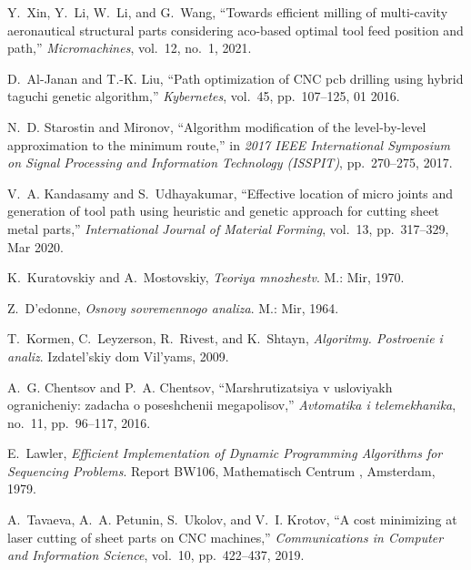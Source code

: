   \item
  Y.~Xin, Y.~Li, W.~Li, and G.~Wang, ``Towards efficient milling of multi-cavity
    aeronautical structural parts considering aco-based optimal tool feed
    position and path,'' {\em Micromachines}, vol.~12, no.~1, 2021.

  \item
  D.~Al-Janan and T.-K. Liu, ``Path optimization of {CNC} pcb drilling using
    hybrid taguchi genetic algorithm,'' {\em Kybernetes}, vol.~45, pp.~107--125,
    01 2016.

  \item
  N.~D. Starostin and Mironov, ``Algorithm modification of the level-by-level
    approximation to the minimum route,'' in {\em 2017 IEEE International
    Symposium on Signal Processing and Information Technology (ISSPIT)},
    pp.~270--275, 2017.

  \item
  V.~A. Kandasamy and S.~Udhayakumar, ``{Effective location of micro joints and
    generation of tool path using heuristic and genetic approach for cutting
    sheet metal parts},'' {\em International Journal of Material Forming},
    vol.~13, pp.~317--329, Mar 2020.

  \item
  K.~Kuratovskiy and A.~Mostovskiy, {\em Teoriya mnozhestv}.
  \newblock M.: Mir, 1970.

  \item
  Z.~D'edonne, {\em Osnovy sovremennogo analiza}.
  \newblock M.: Mir, 1964.

  \item
  T.~Kormen, C.~Leyzerson, R.~Rivest, and K.~Shtayn, {\em Algoritmy. Postroenie i
    analiz}.
  \newblock Izdatel'skiy dom Vil'yams, 2009.

  \item
  A.~G. Chentsov and P.~A. Chentsov, ``Marshrutizatsiya v usloviyakh
    ogranicheniy: zadacha o poseshchenii megapolisov,'' {\em Avtomatika i
    telemekhanika}, no.~11, pp.~96--117, 2016.

  \item
  E.~Lawler, {\em Efficient Implementation of Dynamic Programming Algorithms for
    Sequencing Problems}.
  \newblock Report BW106, Mathematisch Centrum , Amsterdam, 1979.

  \item
  A.~Tavaeva, A.~A. Petunin, S.~Ukolov, and V.~I. Krotov, ``A cost minimizing at
    laser cutting of sheet parts on {{CNC}} machines,'' {\em Communications in
    Computer and Information Science}, vol.~10, pp.~422--437, 2019.
